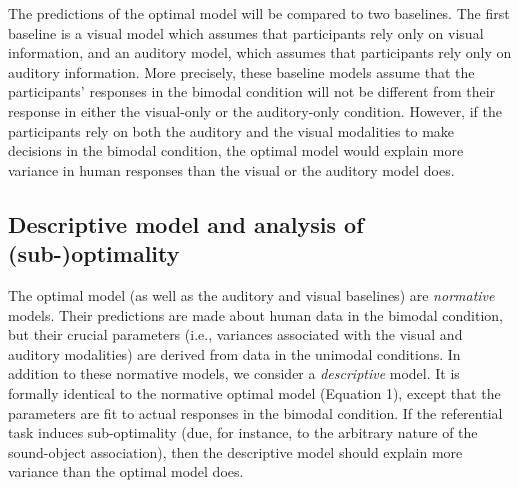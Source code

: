 \documentclass[english,,man,floatsintext]{apa6}
\theoremstyle{definition}
\theoremstyle{definition}
\theoremstyle{definition}
\theoremstyle{remark}
\begin{document}
The predictions of the optimal model will be compared to two baselines.
The first baseline is a visual model which assumes that participants
rely only on visual information, and an auditory model, which assumes
that participants rely only on auditory information. More precisely,
these baseline models assume that the participants' responses in the
bimodal condition will not be different from their response in either
the visual-only or the auditory-only condition. However, if the
participants rely on both the auditory and the visual modalities to make
decisions in the bimodal condition, the optimal model would explain more
variance in human responses than the visual or the auditory model does.

\subsection{Descriptive model and analysis of
(sub-)optimality}\label{descriptive-model-and-analysis-of-sub-optimality}

The optimal model (as well as the auditory and visual baselines) are
\emph{normative} models. Their predictions are made about human data in
the bimodal condition, but their crucial parameters (i.e., variances
associated with the visual and auditory modalities) are derived from
data in the unimodal conditions. In addition to these normative models,
we consider a \emph{descriptive} model. It is formally identical to the
normative optimal model (Equation 1), except that the parameters are fit
to actual responses in the bimodal condition. If the referential task
induces sub-optimality (due, for instance, to the arbitrary nature of
the sound-object association), then the descriptive model should explain
more variance than the optimal model does.
\end{document}
